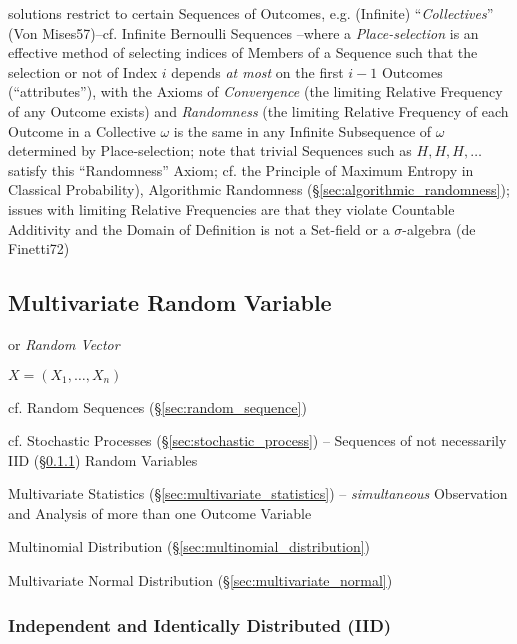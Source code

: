 solutions restrict to certain Sequences of Outcomes, e.g. (Infinite)
``\emph{Collectives}'' (Von Mises57)--cf. Infinite Bernoulli Sequences --where a
\emph{Place-selection} is an effective method of selecting indices of Members of
a Sequence such that the selection or not of Index $i$ depends \emph{at most} on
the first $i-1$ Outcomes (``attributes''), with the Axioms of \emph{Convergence}
(the limiting Relative Frequency of any Outcome exists) and \emph{Randomness}
(the limiting Relative Frequency of each Outcome in a Collective $\omega$ is the
same in any Infinite Subsequence of $\omega$ determined by Place-selection; note
that trivial Sequences such as $H,H,H,\ldots$ satisfy this ``Randomness'' Axiom;
cf. the Principle of Maximum Entropy in Classical Probability), Algorithmic
Randomness (\S\ref{sec:algorithmic_randomness});
issues with limiting Relative Frequencies are that they violate Countable
Additivity and the Domain of Definition is not a Set-field or a $\sigma$-algebra
(de Finetti72)



\subsection{Multivariate Random Variable}\label{sec:random_vector}

or \emph{Random Vector}

$X = (X_1, \ldots, X_n)$

cf. Random Sequences (\S\ref{sec:random_sequence})

\fist cf. Stochastic Processes (\S\ref{sec:stochastic_process}) -- Sequences of
not necessarily IID (\S\ref{sec:iid}) Random Variables

\fist Multivariate Statistics (\S\ref{sec:multivariate_statistics}) --
\emph{simultaneous} Observation and Analysis of more than one Outcome Variable

Multinomial Distribution (\S\ref{sec:multinomial_distribution})

Multivariate Normal Distribution (\S\ref{sec:multivariate_normal})



\subsubsection{Independent and Identically Distributed (IID)}\label{sec:iid}

